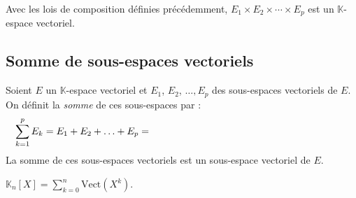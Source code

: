 \documentclass[a4paper,10pt]{report}
\newcommand{\Sum}[2]{\ensuremath{\textstyle{\sum\limits_{#1}^{#2}}}}
\begin{document}
\begin{prop}
Avec les lois de composition définies précédemment, $E_1 \times E_2 \times \cdots \times E_p$ est un $\mathbb{K}$-espace vectoriel.
\end{prop}







\subsection{Somme de sous-espaces vectoriels}

\begin{defip}
Soient $E$ un $\mathbb{K}$-espace vectoriel et $E_1$, $E_2$, $\ldots, E_p$ des sous-espaces vectoriels de $E$. On définit la \textit{somme} de ces sous-espaces par :
$$ \sum_{k=1}^p E_k = E_1 + E_2 + \ldots + E_p = \phantom{\left\lbrace \sum_{k=1}^p x_k \, \big{\vert} \, (x_1, x_2, \ldots, x_p) \in E_1 \times E_2 \times \cdots E_p \right\rbrace}$$
La somme de ces sous-espaces vectoriels est un sous-espace vectoriel de $E$.
\end{defip}

\begin{preuve}

\vspace{6cm}


\end{preuve}

\begin{ex} $\mathbb{K}_n[X] = \Sum{k=0}{n} \textrm{Vect}(X^k)$.
\end{ex}
\end{document}
